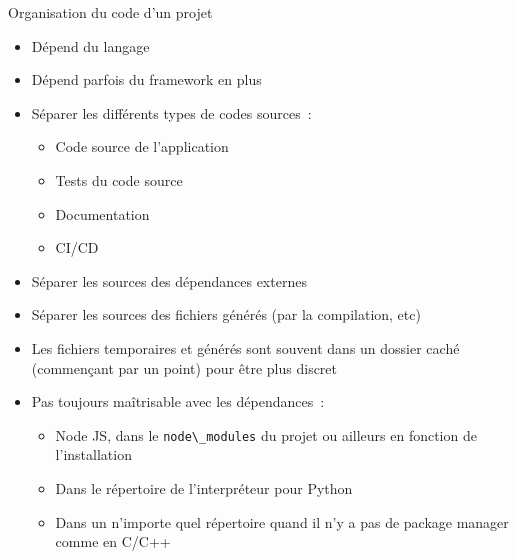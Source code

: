 \documentclass{beamer}
\begin{document}
    \begin{frame}{Organisation du code d'un projet}

        \begin{itemize}

            \item Dépend du langage
            \item Dépend parfois du framework en plus
            \item Séparer les différents types de codes sources~:
            \begin{itemize}
                \item Code source de l'application
                \item Tests du code source
                \item Documentation
                \item CI/CD
            \end{itemize}
            \item Séparer les sources des dépendances externes
            \item Séparer les sources des fichiers générés (par la compilation, etc)
            \item Les fichiers temporaires et générés sont souvent dans un dossier caché (commençant par un point) pour être plus discret
            \item Pas toujours maîtrisable avec les dépendances~:
            \begin{itemize}
                \item Node JS, dans le \lstinline{node\_modules} du projet ou ailleurs en fonction de l'installation
                \item Dans le répertoire de l'interpréteur pour Python
                \item Dans un n'importe quel répertoire quand il n'y a pas de package manager comme en C/C++
            \end{itemize}

        \end{itemize}


    \end{frame}
\end{document}
